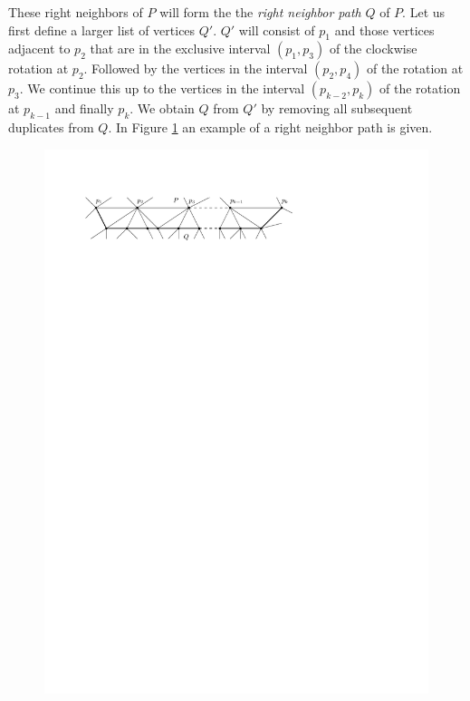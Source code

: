     These right neighbors of $P$ will form the the \emph{right neighbor path} $Q$ of $P$.
    Let us first define a larger list of vertices $Q'$. $Q'$ will consist of $p_1$ and those vertices adjacent to $p_{2}$ that are in the exclusive interval $(p_1, p_3)$ of the clockwise rotation at $p_2$. Followed by the vertices in the interval $(p_2, p_4)$ of the rotation at $p_{3}$. We continue this up to the vertices in the interval $(p_{k-2}, p_k)$ of the rotation at $p_{k-1}$ and finally $p_k$.
    We obtain $Q$ from $Q'$ by removing all subsequent duplicates from $Q$.
    In Figure \ref{fig:right:neighborPath} an example of a right neighbor path is given.

    \begin{figure}[h]
      \centering
      \includegraphics[scale=1]{unifiedAlgo/img/rightNeighbourwalk/neighborPath.pdf}
      \caption{}
      \label{fig:right:neighborPath}
    \end{figure}


